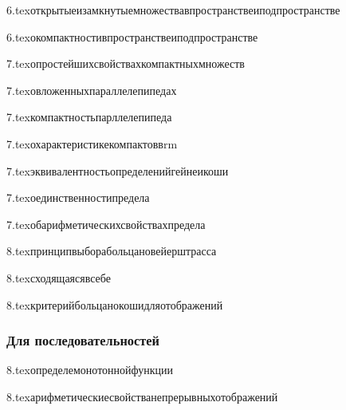 {6.tex}{открытыеизамкнутыемножествавпространствеиподпространстве}

{6.tex}{окомпактностивпространствеиподпространстве}

{7.tex}{опростейшихсвойствахкомпактныхмножеств}

{7.tex}{овложенныхпараллелепипедах}

{7.tex}{компактностьпарллелепипеда}

{7.tex}{охарактеристикекомпактоввrm}

{7.tex}{эквивалентностьопределенийгейнеикоши}

{7.tex}{оединственностипредела}



{7.tex}{обарифметическихсвойствахпредела}

{8.tex}{принципвыборабольцановейерштрасса}

{8.tex}{сходящаясявсебе}


{8.tex}{критерийбольцанокошидляотображений}

\subsubsection{Для последовательностей}


{8.tex}{определемонотоннойфункции}

{8.tex}{арифметическиесвойстванепрерывныхотображений}

